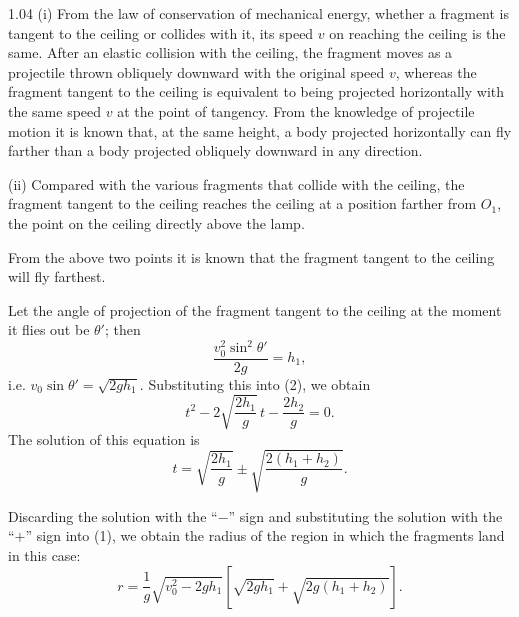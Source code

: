 \begin{solution}{1.04}
(i) From the law of conservation of mechanical energy, whether a fragment is tangent to the
ceiling or collides with it, its speed $v$ on reaching the ceiling is the same. After an elastic
collision with the ceiling, the fragment moves as a projectile thrown obliquely downward with
the original speed $v$, whereas the fragment tangent to the ceiling is equivalent to being
projected horizontally with the same speed $v$ at the point of tangency. From the knowledge of
projectile motion it is known that, at the same height, a body projected horizontally can fly
farther than a body projected obliquely downward in any direction.

(ii) Compared with the various fragments that collide with the ceiling, the fragment tangent to
the ceiling reaches the ceiling at a position farther from $O_1$, the point on the ceiling
directly above the lamp.

From the above two points it is known that the fragment tangent to the ceiling will fly farthest.

Let the angle of projection of the fragment tangent to the ceiling at the moment it flies out be
$\theta'$; then
\begin{equation*}
\frac{v_0^2\sin^2\theta'}{2g} = h_1,
\end{equation*}
i.e. $v_0\sin\theta'=\sqrt{2gh_1}$. Substituting this into (2), we obtain
\begin{equation*}
t^2-2\sqrt{\frac{2h_1}{g}}\,t-\frac{2h_2}{g}=0.
\end{equation*}
The solution of this equation is
\begin{equation*}
t = \sqrt{\frac{2h_1}{g}}\pm\sqrt{\frac{2(h_1+h_2)}{g}}.
\end{equation*}

Discarding the solution with the ``$-$'' sign and substituting the solution with the ``$+$''
sign into (1), we obtain the radius of the region in which the fragments land in this case:
\begin{equation*}
r = \frac{1}{g}\sqrt{v_0^2-2gh_1}
\left[\sqrt{2gh_1}+\sqrt{2g(h_1+h_2)}\right].
\end{equation*}
\end{solution}

